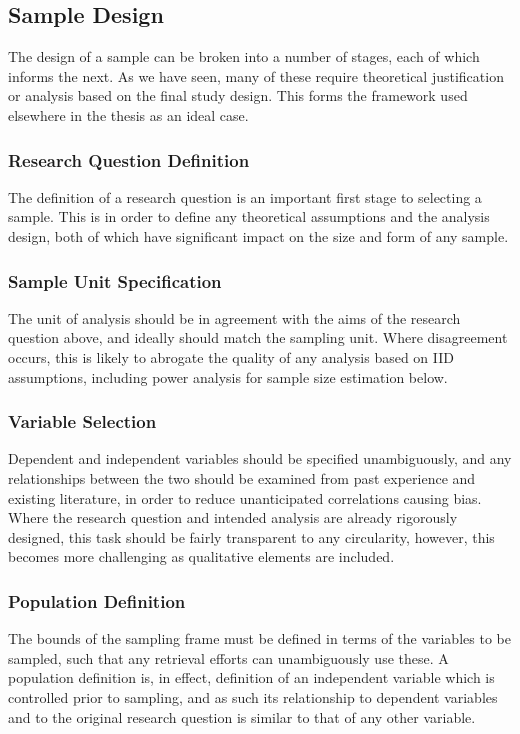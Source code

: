 \subsection{Sample Design}
The design of a sample can be broken into a number of stages, each of which informs the next.  As we have seen, many of these require theoretical justification or analysis based on the final study design.  This forms the framework used elsewhere in the thesis as an ideal case.

%

\subsubsection{Research Question Definition}
The definition of a research question is an important first stage to selecting a sample.  This is in order to define any theoretical assumptions and the analysis design, both of which have significant impact on the size and form of any sample.

\subsubsection{Sample Unit Specification}
The unit of analysis should be in agreement with the aims of the research question above, and ideally should match the sampling unit.  Where disagreement occurs, this is likely to abrogate the quality of any analysis based on IID assumptions, including power analysis for sample size estimation below.

\subsubsection{Variable Selection}
Dependent and independent variables should be specified unambiguously, and any relationships between the two should be examined from past experience and existing literature, in order to reduce unanticipated correlations causing bias.  Where the research question and intended analysis are already rigorously designed, this task should be fairly transparent to any circularity, however, this becomes more challenging as qualitative elements are included.

\subsubsection{Population Definition}
The bounds of the sampling frame must be defined in terms of the variables to be sampled, such that any retrieval efforts can unambiguously use these.  A population definition is, in effect, definition of an independent variable which is controlled prior to sampling, and as such its relationship to dependent variables and to the original research question is similar to that of any other variable.

